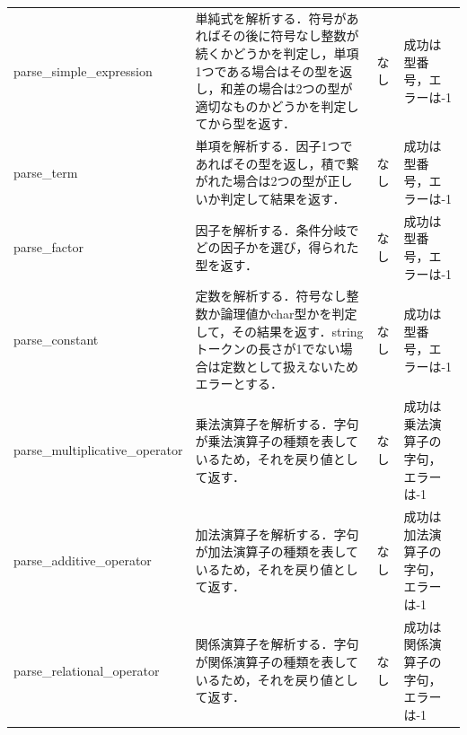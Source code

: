 \documentclass{jlreq}
\begin{document}
\begin{table}[H]
{\begin{tabular}{|l|p{15cm}|l|p{6cm}|}
      parse\_simple\_expression       & 単純式を解析する．符号があればその後に符号なし整数が続くかどうかを判定し，単項1つである場合はその型を返し，和差の場合は2つの型が適切なものかどうかを判定してから型を返す．                                                                                     & なし & 成功は型番号，エラーは-1           \\
      parse\_term                     & 単項を解析する．因子1つであればその型を返し，積で繋がれた場合は2つの型が正しいか判定して結果を返す．                                                                                                                                                           & なし & 成功は型番号，エラーは-1           \\
      parse\_factor                   & 因子を解析する．条件分岐でどの因子かを選び，得られた型を返す．                                                                                                                                                                                                 & なし & 成功は型番号，エラーは-1           \\
      parse\_constant                 & 定数を解析する．符号なし整数か論理値かchar型かを判定して，その結果を返す．stringトークンの長さが1でない場合は定数として扱えないためエラーとする．                                                                                                              & なし & 成功は型番号，エラーは-1           \\
      parse\_multiplicative\_operator & 乗法演算子を解析する．字句が乗法演算子の種類を表しているため，それを戻り値として返す．                                                                                                                                                                         & なし & 成功は乗法演算子の字句，エラーは-1 \\
      parse\_additive\_operator       & 加法演算子を解析する．字句が加法演算子の種類を表しているため，それを戻り値として返す．                                                                                                                                                                         & なし & 成功は加法演算子の字句，エラーは-1 \\
      parse\_relational\_operator     & 関係演算子を解析する．字句が関係演算子の種類を表しているため，それを戻り値として返す．                                                                                                                                                                         & なし & 成功は関係演算子の字句，エラーは-1 \\

\end{tabular}}
\end{table}
\end{document}

